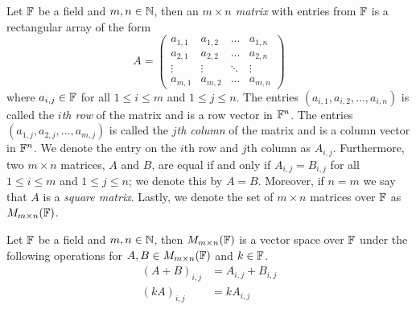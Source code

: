 \begin{definition}[Matrix]
	Let $\mathbb{F}$ be a field and $m,n\in\mathbb{N}$, then an \textit{$m\times n$ matrix} with entries from $\mathbb{F}$ is a rectangular array of the form
	\[
		A=
		\begin{pmatrix}
			a_{1,1} & a_{1,2} & \ldots & a_{1,n}\\
			a_{2,1} & a_{2,2} & \ldots & a_{2,n}\\
			\vdots & \vdots & \ddots & \vdots\\
			a_{m,1} & a_{m,2} & \ldots & a_{m,n}
		\end{pmatrix}
	\]
	where $a_{i,j}\in\mathbb{F}$ for all $1\leq i \leq m$ and $1\leq j \leq n$.
	The entries $(a_{i,1},a_{i,2},\ldots,a_{i,n})$ is called the \textit{$i$th row} of the matrix and is a row vector in $\mathbb{F}^n$.
	The entries $(a_{1,j},a_{2,j},\ldots,a_{m,j})$ is called the \textit{$j$th column} of the matrix and is a column vector in $\mathbb{F}^n$.
	We denote the entry on the $i$th row and $j$th column as $A_{i,j}$.
	Furthermore, two $m\times n$ matrices, $A$ and $B$, are equal if and only if $A_{i,j}=B_{i,j}$ for all $1\leq i\leq m$ and $1\leq j\leq n$; we denote this by $A=B$.
	Moreover, if $n=m$ we say that $A$ is a \textit{square matrix}.
	Lastly, we denote the set of $m\times n$ matrices over $\mathbb{F}$ as $M_{m\times n}(\mathbb{F})$.
\end{definition}
\begin{example}
	Let $\mathbb{F}$ be a field and $m,n\in\mathbb{N}$, then $M_{m\times n}(\mathbb{F})$ is a vector space over $\mathbb{F}$ under the following operations for $A,B\in M_{m\times n}(\mathbb{F})$ and $k\in\mathbb{F}$.
	\begin{align*}
		(A+B)_{i,j}&=A_{i,j}+B_{i,j}\\
		(kA)_{i,j}&=kA_{i,j}
	\end{align*}
\end{example}
